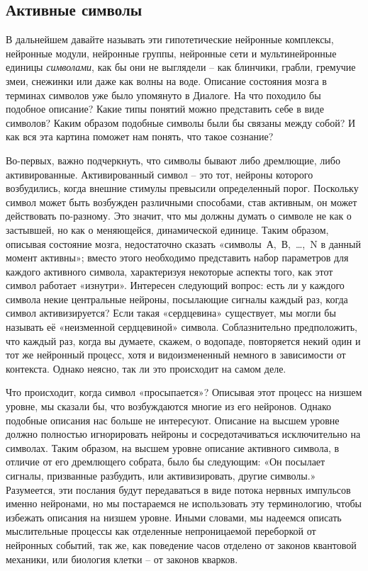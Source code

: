 \documentclass[../main.tex]{subfiles}
\begin{document}
\subsection{Активные символы}

В дальнейшем давайте называть эти гипотетические нейронные комплексы, нейронные модули, нейронные группы, нейронные сети и мультинейронные единицы \emph{символами}, как бы они не выглядели \--- как блинчики, грабли, гремучие змеи, снежинки или даже как волны на воде. Описание состояния мозга в терминах символов уже было упомянуто в Диалоге. На что походило бы подобное описание? Какие типы понятий можно представить себе в виде символов? Каким образом подобные символы были бы связаны между собой? И как вся эта картина поможет нам понять, что такое сознание?

Во-первых, важно подчеркнуть, что символы бывают либо дремлющие, либо активированные. Активированный символ \--- это тот, нейроны которого возбудились, когда внешние стимулы превысили определенный порог. Поскольку символ может быть возбужден различными способами, став активным, он может действовать по-разному. Это значит, что мы должны думать о символе не как о застывшей, но как о меняющейся, динамической единице. Таким образом, описывая состояние мозга, недостаточно сказать «символы~А,~В,~\ldots{},~N в данный момент активны»; вместо этого необходимо представить набор параметров для каждого активного символа, характеризуя некоторые аспекты того, как этот символ работает «изнутри». Интересен следующий вопрос: есть ли у каждого символа некие центральные нейроны, посылающие сигналы каждый раз, когда символ активизируется? Если такая «сердцевина» существует, мы могли бы называть её «неизменной сердцевиной» символа. Соблазнительно предположить, что каждый раз, когда вы думаете, скажем, о водопаде, повторяется некий один и тот же нейронный процесс, хотя и видоизмененный немного в зависимости от контекста. Однако неясно, так ли это происходит на самом деле.

Что происходит, когда символ «просыпается»? Описывая этот процесс на низшем уровне, мы сказали бы, что возбуждаются многие из его нейронов. Однако подобные описания нас больше не интересуют. Описание на высшем уровне должно полностью игнорировать нейроны и сосредотачиваться исключительно на символах. Таким образом, на высшем уровне описание активного символа, в отличие от его дремлющего собрата, было бы следующим: «Он посылает сигналы, призванные разбудить, или активизировать, другие символы.» Разумеется, эти послания будут передаваться в виде потока нервных импульсов именно нейронами, но мы постараемся не использовать эту терминологию, чтобы избежать описания на низшем уровне. Иными словами, мы надеемся описать мыслительные процессы как отделенные непроницаемой переборкой от нейронных событий, так же, как поведение часов отделено от законов квантовой механики, или биология клетки \--- от законов кварков.
\end{document}
